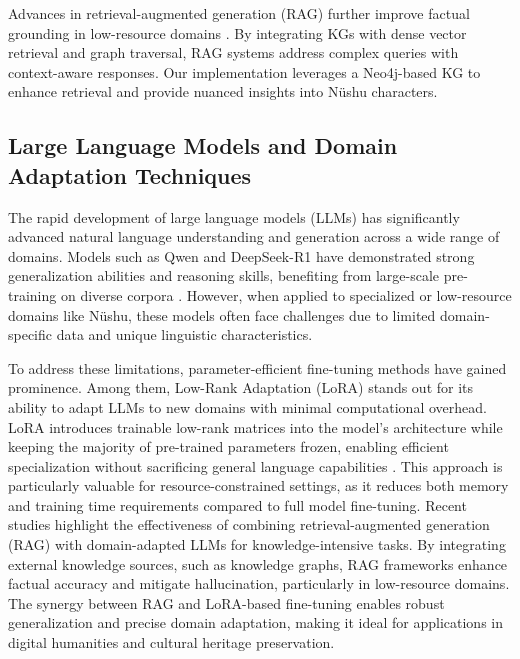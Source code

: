 \documentclass{article}
\begin{document}
    Advances in retrieval-augmented generation (RAG) further improve factual grounding in low-resource domains \cite{gaoRetrievalAugmentedGenerationLarge2024}. By integrating KGs with dense vector retrieval and graph traversal, RAG systems address complex queries with context-aware responses. Our implementation leverages a Neo4j-based KG to enhance retrieval and provide nuanced insights into N\"{u}shu characters.



\subsection{Large Language Models and Domain Adaptation Techniques}
\label{ssec:llm_lora}
    The rapid development of large language models (LLMs) has significantly advanced natural language understanding and generation across a wide range of domains. Models such as Qwen and DeepSeek-R1 have demonstrated strong generalization abilities and reasoning skills, benefiting from large-scale pre-training on diverse corpora \cite{baiQwenTechnicalReport2023, deepseek-aiDeepSeekR1IncentivizingReasoning2025}. However, when applied to specialized or low-resource domains like N\"{u}shu, these models often face challenges due to limited domain-specific data and unique linguistic characteristics.

    To address these limitations, parameter-efficient fine-tuning methods have gained prominence. Among them, Low-Rank Adaptation (LoRA) stands out for its ability to adapt LLMs to new domains with minimal computational overhead. LoRA introduces trainable low-rank matrices into the model's architecture while keeping the majority of pre-trained parameters frozen, enabling efficient specialization without sacrificing general language capabilities \cite{huLoRALowRankAdaptation2021}. This approach is particularly valuable for resource-constrained settings, as it reduces both memory and training time requirements compared to full model fine-tuning.
    Recent studies highlight the effectiveness of combining retrieval-augmented generation (RAG) with domain-adapted LLMs for knowledge-intensive tasks. By integrating external knowledge sources, such as knowledge graphs, RAG frameworks enhance factual accuracy and mitigate hallucination, particularly in low-resource domains. The synergy between RAG and LoRA-based fine-tuning enables robust generalization and precise domain adaptation, making it ideal for applications in digital humanities and cultural heritage preservation.
\end{document}
